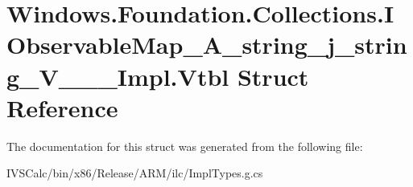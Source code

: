 \hypertarget{struct_windows_1_1_foundation_1_1_collections_1_1_i_observable_map___a__string__j__string___v_______impl_1_1_vtbl}{}\section{Windows.\+Foundation.\+Collections.\+I\+Observable\+Map\+\_\+\+A\+\_\+string\+\_\+j\+\_\+string\+\_\+\+V\+\_\+\+\_\+\+\_\+\+Impl.\+Vtbl Struct Reference}
\label{struct_windows_1_1_foundation_1_1_collections_1_1_i_observable_map___a__string__j__string___v_______impl_1_1_vtbl}


The documentation for this struct was generated from the following file\+:\begin{DoxyCompactItemize}
\item 
I\+V\+S\+Calc/bin/x86/\+Release/\+A\+R\+M/ilc/Impl\+Types.\+g.\+cs\end{DoxyCompactItemize}
